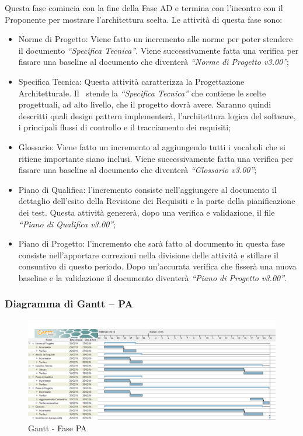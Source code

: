 \documentclass[../PianoProgetto.tex]{subfiles}
\begin{document}
		Questa fase comincia con la fine della Fase AD e termina con l’incontro con il Proponente per mostrare l’architettura scelta. Le attività di questa fase sono:
		\begin{itemize}
			\item Norme di Progetto: Viene fatto un incremento alle norme per poter stendere il documento \textit{“Specifica Tecnica”}. Viene successivamente fatta una verifica per fissare una baseline al documento che diventerà \textit{“Norme di Progetto v3.00”};

			\item Specifica Tecnica: Questa attività caratterizza la Progettazione Architetturale. Il \progettista\ stende la \textit{“Specifica Tecnica”} che contiene le scelte progettuali, ad alto livello, che il progetto dovrà avere. Saranno quindi descritti quali design pattern implementerà, l’architettura logica del software, i principali flussi di controllo e il tracciamento dei requisiti;

			\item Glossario: Viene fatto un incremento al \glossario aggiungendo tutti i vocaboli che si ritiene importante siano inclusi. Viene successivamente fatta una verifica per fissare una baseline al documento che diventerà \textit{“Glossario v3.00”};

 			\item Piano di Qualifica: l’incremento consiste nell’aggiungere al documento \pianodiqualifica il dettaglio dell’esito della Revisione dei Requisiti e la parte della pianificazione dei test. Questa attività genererà, dopo una verifica e validazione, il file \textit{“Piano di Qualifica v3.00”};

			\item Piano di Progetto: l’incremento che sarà fatto al documento \pianodiprogetto in questa fase consiste nell’apportare correzioni nella divisione delle attività e stillare il consuntivo di questo periodo. Dopo un’accurata verifica che fisserà una nuova baseline e la validazione il documento diventerà \textit{“Piano di Progetto v3.00”}.
		\end{itemize}
		
		\subsubsection{Diagramma di Gantt – PA}
			\begin{figure}[!h]
				\centering
				\includegraphics[width=\textwidth]{gantt_png/3-progettazione_architetturale}
				\caption{Gantt - Fase PA}
				\label{fig:Gantt - Fase PA}
			\end{figure}
						
\end{document}
